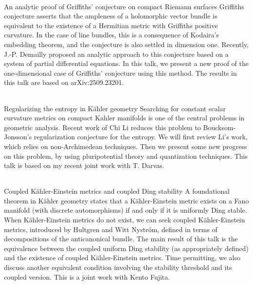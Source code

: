 \documentclass[dvipdfmx,a4paper,12pt]{article}
\theoremstyle{plain} %
\theoremstyle{definition} %
\begin{document}
\\
An analytic proof of Griffiths' conjecture on compact Riemann surfaces
\vskip3mm
Griffiths conjecture asserts that the ampleness of a holomorphic vector bundle is equivalent to the existence of a Hermitian metric with Griffiths positive curvature. In the case of line bundles, this is a consequence of Kodaira's embedding theorem, and the conjecture is also settled in dimension one. Recently, J.-P. Demailly proposed an analytic approach to this conjecture based on a system of partial differential equations. In this talk, we present a new proof of the one-dimensional case of Griffiths' conjecture using this method. The results in this talk are based on arXiv:2509.23201.

\newpage

\vskip5mm
\\
Regularizing the entropy in K\"ahler geometry
\vskip3mm
Searching for constant scalar curvature metrics on compact Kahler manifolds is one of the central problems in geometric analysis. Recent work of Chi Li reduces this problem to Boucksom-Jonsson's regularization conjecture for the entropy. We will first review Li's work, which relies on non-Archimedean techniques. Then we present some new progress on this problem, by using pluripotential theory and quantization techniques. This talk is based on my recent joint work with T. Darvas.
\vskip8mm

\\
Coupled Kähler-Einstein metrics and coupled Ding stability 
\vskip3mm
A foundational theorem in Kähler geometry states that a Kähler-Einstein metric exists on a Fano manifold (with discrete automorphisms) if and only if it is uniformly Ding stable. When Kähler-Einstein metrics do not exist, we can seek coupled Kähler-Einstein metrics, introduced by Hultgren and Witt Nyström, defined in terms of decompositions of the anticanonical bundle. The main result of this talk is the equivalence between the coupled uniform Ding stability (as appropriately defined) and the existence of coupled Kähler-Einstein metrics. Time permitting, we also discuss another equivalent condition involving the stability threshold and its coupled version. This is a joint work with Kento Fujita.
\vskip8mm
\end{document}

